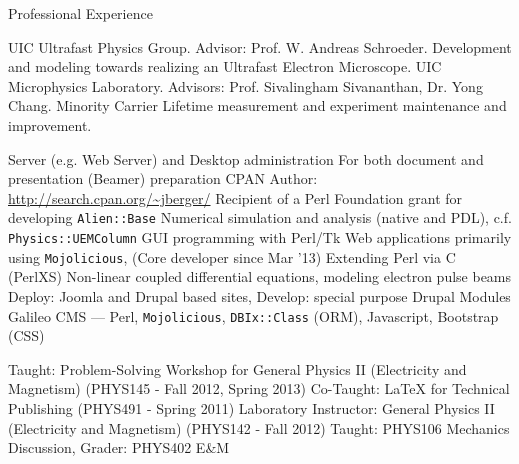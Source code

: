 \begin{rubric}{Professional Experience}


  \entry*[2005 --- \ldots] UIC Ultrafast Physics Group. Advisor: Prof. W. Andreas Schroeder. Development and modeling towards realizing an Ultrafast Electron Microscope.
  \entry*[2003 --- 2005] UIC Microphysics Laboratory. Advisors: Prof. Sivalingham Sivananthan, Dr. Yong Chang. Minority Carrier Lifetime measurement and experiment maintenance and improvement.


  \entry*[Linux] Server (e.g. Web Server) and Desktop administration
  \entry*[\LaTeX] For both document and presentation (Beamer) preparation
  \entry*[Perl] CPAN Author: \url{http://search.cpan.org/~jberger/}
  \entry*[Perl] Recipient of a Perl Foundation grant for developing \texttt{Alien::Base}
  \entry*[Perl] Numerical simulation and analysis (native and PDL), c.f. \texttt{Physics::UEMColumn}
  \entry*[Perl] GUI programming with Perl/Tk
  \entry*[Perl] Web applications primarily using \texttt{Mojolicious}, (Core developer since Mar '13)
  \entry*[Perl] Extending Perl via C (PerlXS)
  \entry*[Mathematica] Non-linear coupled differential equations, modeling electron pulse beams
  \entry*[PHP] Deploy: Joomla and Drupal based sites, Develop: special purpose Drupal Modules
  \entry*[Multi] Galileo CMS --- Perl, \texttt{Mojolicious}, \texttt{DBIx::Class} (ORM), Javascript, Bootstrap (CSS) 
  

  \entry*[Teaching] Taught: Problem-Solving Workshop for General Physics II (Electricity and Magnetism) (PHYS145 - Fall 2012, Spring 2013) 
  \entry*[Teaching] Co-Taught: \LaTeX{} for Technical Publishing (PHYS491 - Spring 2011)
  \entry*[T.A.] Laboratory Instructor: General Physics II (Electricity and Magnetism) (PHYS142 - Fall 2012)
  \entry*[T.A.] Taught: PHYS106 Mechanics Discussion, Grader: PHYS402 E\&M

\end{rubric}
